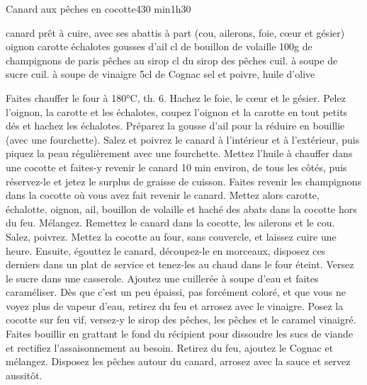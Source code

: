 \begin{recette}{Canard aux pêches en cocotte}{4}{30 min}{1h30}

\begin{ingredients}
 canard prêt à cuire, avec ses abattis à part (cou, ailerons, foie, cœur et gésier)
 oignon
 carotte
 échalotes
 gousses d'ail
 cl de bouillon de volaille
\ingredient 100g de champignons de paris
 pêches au sirop
 cl du sirop des pêches
 cuil. à soupe de sucre
 cuil. à soupe de vinaigre
\ingredient 5cl de Cognac
\ingredient sel et poivre, huile d'olive
\end{ingredients}

\begin{preparation}
\etape Faites chauffer le four à 180°C, th. 6.
\etape Hachez le foie, le cœur et le gésier.
\etape Pelez l'oignon, la carotte et les échalotes, coupez l'oignon et la carotte en tout petits dés et hachez les échalotes. Préparez la gousse d'ail pour la réduire en bouillie (avec une fourchette).
\etape Salez et poivrez le canard à l'intérieur et à l'extérieur, puis piquez la peau régulièrement avec une fourchette.
\etape Mettez l'huile à chauffer dans une cocotte et faites-y revenir le canard 10 min environ, de tous les côtés, puis réservez-le et jetez le surplus de graisse de cuisson.
\etape Faites revenir les champignons dans la cocotte où vous avez fait revenir le canard.
\etape Mettez alors carotte, échalotte, oignon, ail, bouillon de volaille et haché des abats dans la cocotte hors du feu. Mélangez.
\etape Remettez le canard dans la cocotte, les ailerons et le cou. Salez, poivrez.
\etape Mettez la cocotte au four, sans couvercle, et laissez cuire une heure. Ensuite, égouttez le canard, découpez-le en morceaux, disposez ces derniers dans un plat de service et tenez-les au chaud dans le four éteint.
\etape Versez le sucre dans une casserole. Ajoutez une cuillerée à soupe d'eau et faites caraméliser. Dès que c'est un peu épaissi, pas forcément coloré, et que vous ne voyez plus de vapeur d'eau, retirez du feu et arrosez avec le vinaigre.
\etape Posez la cocotte sur feu vif, versez-y le sirop des pêches, les pêches et le caramel vinaigré. Faites bouillir en grattant le fond du récipient pour dissoudre les sucs de viande et rectifiez l'assaisonnement au besoin.
\etape Retirez du feu, ajoutez le Cognac et mélangez.
\etape Disposez les pêches autour du canard, arrosez avec la sauce et servez aussitôt.
\end{preparation}
\end{recette}



